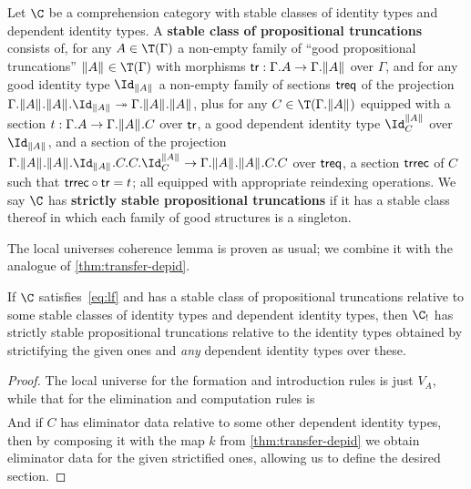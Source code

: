\begin{enumerate}
\begin{defn}\label{defn:proptrunc}
  Let $\C$ be a comprehension category with stable classes of identity types and dependent identity types.
  A \textbf{stable class of propositional truncations} consists of, for any $A\in\T(\Gamma)$ a non-empty family of ``good propositional truncations'' $\brck A\in\T(\Gamma)$ with morphisms $\mathsf{tr}: \Gamma.A \to \Gamma.\mathopen{}\left\Vert A\right\Vert_{}\mathclose{}$ over $\Gamma$, and for any good identity type $\Id_{\brck A}$ a non-empty family of sections $\mathsf{treq}$ of the projection $\Gamma.\brck A.\brck A.\Id_{\brck A} \fib \Gamma.\brck A.\brck A$, plus for any $C\in\T(\Gamma.\brck A)$ equipped with a section $t:\Gamma.A\to\Gamma.\mathopen{}\left\Vert A\right\Vert_{}\mathclose{}.C$ over $\mathsf{tr}$, a good dependent identity type $\Id^{\brck A}_C$ over $\Id_{\brck A}$, and a section of the projection $\Gamma.\brck A.\brck A.\Id_{\brck A}.C.C.\Id^{\brck A}_C \to \Gamma.\brck A.\brck A.C.C$ over  $\mathsf{treq}$, a section $\mathsf{trrec}$ of $C$ such that $\mathsf{trrec} \circ \mathsf{tr} = t$; all equipped with appropriate reindexing operations.
  We say $\C$ has \textbf{strictly stable propositional truncations} if it has a stable class thereof in which each family of good structures is a singleton.
\end{defn}

The local universes coherence lemma is proven as usual; we combine it with the analogue of \cref{thm:transfer-depid}.

\begin{lem}
  If $\C$ satisfies~\eqref{eq:lf} and has a stable class of propositional truncations relative to some stable classes of identity types and dependent identity types, then $\C_!$ has strictly stable propositional truncations relative to the identity types obtained by strictifying the given ones and \emph{any} dependent identity types over these.
\end{lem}
\begin{proof}
  The local universe for the formation and introduction rules is just $V_A$, while that for the elimination and computation rules is
  \begin{align*}
    [& a:V_A,\\
    &c:\prod z:E_{\brck A}(a) . V_C \\
    &t:\prod x:E_{A}(a) . E_C(c(\tr(x))) \\
    &d:\prod x,y:E_{\brck A}(a), u:E_C(c(x)), v:E_C(c(y)) . E_{\Id^{\brck A}_C}(a,x,y,u,v) ]
  \end{align*}
  And if $C$ has eliminator data relative to some other dependent identity types, then by composing it with the map $k$ from \cref{thm:transfer-depid} we obtain eliminator data for the given strictified ones, allowing us to define the desired section.
\end{proof}


\end{enumerate}
